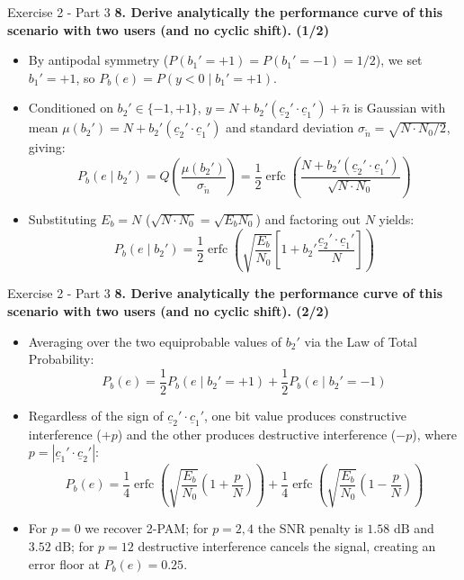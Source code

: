 \documentclass[10pt, aspectratio=169]{beamer}
\newcommand{\question}[1]{{\color{QuestionRed}\textbf{#1}}}
\begin{document}
	\begin{frame}{Exercise 2 - Part 3}
		\question{8. Derive analytically the performance curve of this scenario with two users (and no cyclic shift). (1/2)}
		
		\vspace{0.1cm}
		\begin{itemize}
			\item By antipodal symmetry ($P(b_1'=+1) = P(b_1'=-1) = 1/2$), we set $b_1' = +1$, so $P_b(e) = P(y < 0 \mid b_1' = +1)$.
			\item Conditioned on $b_2' \in \{-1, +1\}$, $y = N + b_2'(\underline{c}_2' \cdot \underline{c}_1') + \tilde{n}$ is Gaussian with mean $\mu(b_2') = N + b_2'(\underline{c}_2' \cdot \underline{c}_1')$ and standard deviation $\sigma_{\tilde{n}} = \sqrt{N \cdot N_0/2}$, giving:
			\[
			P_b(e \mid b_2') = Q\!\left(\frac{\mu(b_2')}{\sigma_{\tilde{n}}}\right) = \frac{1}{2}\operatorname{erfc}\!\left(\frac{N + b_2'(\underline{c}_2' \cdot \underline{c}_1')}{\sqrt{N \cdot N_0}}\right)
			\]
			\item Substituting $E_b = N$ ($\sqrt{N \cdot N_0} = \sqrt{E_b N_0}$) and factoring out $N$ yields:
			\[
			P_b(e \mid b_2') = \frac{1}{2}\operatorname{erfc}\!\left(\sqrt{\frac{E_b}{N_0}}\left[1 + b_2'\frac{\underline{c}_2' \cdot \underline{c}_1'}{N}\right]\right)
			\]
		\end{itemize}
		
	\end{frame}
	
	\begin{frame}{Exercise 2 - Part 3}
		\question{8. Derive analytically the performance curve of this scenario with two users (and no cyclic shift). (2/2)}
		
		\vspace{0.1cm}
		\begin{itemize}
			\item Averaging over the two equiprobable values of $b_2'$ via the Law of Total Probability:
			\[
			P_b(e) = \frac{1}{2}P_b(e \mid b_2' = +1) + \frac{1}{2}P_b(e \mid b_2' = -1)
			\]
			\item Regardless of the sign of $\underline{c}_2' \cdot \underline{c}_1'$, one bit value produces constructive interference ($+p$) and the other produces destructive interference ($-p$), where $p = |\underline{c}_1' \cdot \underline{c}_2'|$:
			\[
			P_b(e) = \frac{1}{4}\operatorname{erfc}\!\left(\sqrt{\frac{E_b}{N_0}}\left(1 + \frac{p}{N}\right)\right) + \frac{1}{4}\operatorname{erfc}\!\left(\sqrt{\frac{E_b}{N_0}}\left(1 - \frac{p}{N}\right)\right)
			\]
			\item For $p = 0$ we recover 2-PAM; for $p = 2, 4$ the SNR penalty is $1.58\text{ dB}$ and $3.52\text{ dB}$; for $p = 12$ destructive interference cancels the signal, creating an error floor at $P_b(e) = 0.25$.
		\end{itemize}
		
	\end{frame}
	
\end{document}
